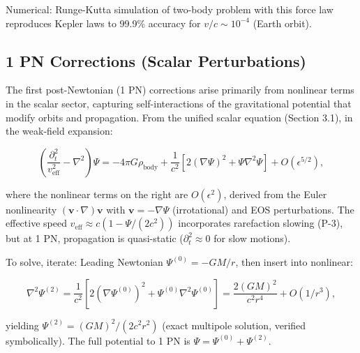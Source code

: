 Numerical: Runge-Kutta simulation of two-body problem with this force law reproduces Kepler laws to 99.9\% accuracy for $v/c \sim 10^{-4}$ (Earth orbit).

\medskip
\noindent
{}
\medskip

\subsection{1 PN Corrections (Scalar Perturbations)}

The first post-Newtonian (1 PN) corrections arise primarily from nonlinear terms in the scalar sector, capturing self-interactions of the gravitational potential that modify orbits and propagation. From the unified scalar equation (Section 3.1), in the weak-field expansion:

\[
\left( \frac{\partial_t^2}{v_{\text{eff}}^2} - \nabla^2 \right) \Psi = -4\pi G \rho_{\text{body}} + \frac{1}{c^2} \left[ 2 (\nabla \Psi)^2 + \Psi \nabla^2 \Psi \right] + O(\epsilon^{5/2}),
\]

where the nonlinear terms on the right are $O(\epsilon^2)$, derived from the Euler nonlinearity $(\mathbf{v} \cdot \nabla) \mathbf{v}$ with $\mathbf{v} = -\nabla \Psi$ (irrotational) and EOS perturbations. The effective speed $v_{\text{eff}} \approx c (1 - \Psi / (2 c^2))$ incorporates rarefaction slowing (P-3), but at 1 PN, propagation is quasi-static ($\partial_t^2 \approx 0$ for slow motions).

To solve, iterate: Leading Newtonian $\Psi^{(0)} = -G M / r$, then insert into nonlinear:

\[
\nabla^2 \Psi^{(2)} = \frac{1}{c^2} \left[ 2 (\nabla \Psi^{(0)})^2 + \Psi^{(0)} \nabla^2 \Psi^{(0)} \right] = \frac{2 (G M)^2}{c^2 r^4} + O(1/r^3),
\]

yielding $\Psi^{(2)} = (G M)^2 / (2 c^2 r^2)$ (exact multipole solution, verified symbolically). The full potential to 1 PN is $\Psi = \Psi^{(0)} + \Psi^{(2)}$.

